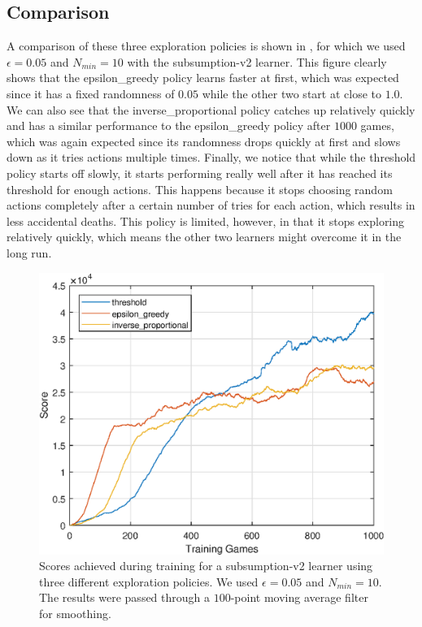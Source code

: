 \documentclass[journal,hidelinks]{IEEEtran}
\begin{document}
\subsection{Comparison}

A comparison of these three exploration policies is shown in , for which we used $\epsilon = 0.05$ and $N_{min} = 10$ with the subsumption-v2 learner. This figure clearly shows that the epsilon\_greedy policy learns faster at first, which was expected since it has a fixed randomness of $0.05$ while the other two start at close to $1.0$. We can also see that the inverse\_proportional policy catches up relatively quickly and has a similar performance to the epsilon\_greedy policy after $1000$ games, which was again expected since its randomness drops quickly at first and slows down as it tries actions multiple times. Finally, we notice that while the threshold policy starts off slowly, it starts performing really well after it has reached its threshold for enough actions. This happens because it stops choosing random actions completely after a certain number of tries for each action, which results in less accidental deaths. This policy is limited, however, in that it stops exploring relatively quickly, which means the other two learners might overcome it in the long run.

\begin{figure}[!htb]
  \centering
  \includegraphics[width=0.8\columnwidth]{figures/exploration.eps}
  \caption{Scores achieved during training for a subsumption-v2 learner using three different exploration policies. We used $\epsilon = 0.05$ and $N_{min} = 10$. The results were passed through a $100$-point moving average filter for smoothing.}
  \label{fig:exploration}
\end{figure}
\end{document}
